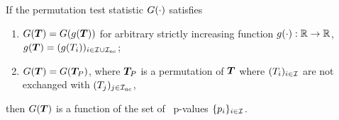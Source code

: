 


\begin{proposition}\label{prop:permutation}
    If the permutation test statistic ${G(\cdot)}$ satisfies
    \begin{enumerate}
        \item \label{prop:assu:monotone.invariance}${G({\boldsymbol{T}})} = {G(g({\boldsymbol{T}}))}$ for arbitrary strictly increasing function $g(\cdot): \mathbb{R} \to \mathbb{R}$,  $g({\boldsymbol{T}}) = (g({T_{i}}))_{i \in  {\mathcal{I}_{}} \cup {\mathcal{I}_{\text{nc}}}}$;
        \item \label{prop:assu:permutation.invariance} ${G({\boldsymbol{T}})} = {G({\boldsymbol{T}}_{P})}$, where ${\boldsymbol{T}}_{P}$ is a permutation of ${\boldsymbol{T}}$ where $({T_{i}})_{i \in  {\mathcal{I}_{}} }$ are not exchanged with $({T_{j}})_{j \in {\mathcal{I}_{\text{nc}}}}$,
    \end{enumerate}
    then
    ${G({\boldsymbol{T}})}$ is a function of the set of \nickname~p-values $\{{p_{i}}\}_{i \in {\mathcal{I}_{}}}$.
\end{proposition}

